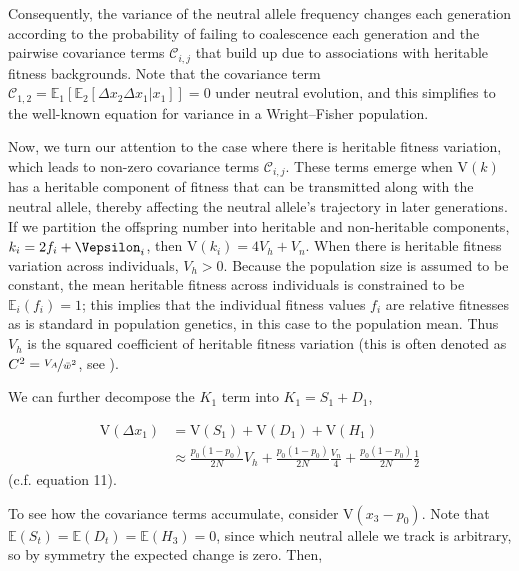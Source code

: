 \documentclass[11pt]{article}
\newcommand{\E}{\mathbb{E}}
\newcommand{\V}{\text{V}}
\newcommand{\V}{\text{V}}
\begin{document}
Consequently, the variance of the neutral allele frequency changes each
generation according to the probability of failing to coalescence each
generation and the pairwise covariance terms $\mathcal{C}_{i,j}$ that build up
due to associations with heritable fitness backgrounds. Note that the
covariance term $\mathcal{C}_{1,2} = \E_1\left[\E_2[\Delta x_2 \Delta x_1 |
x_1]\right] = 0$ under neutral evolution, and this simplifies to the well-known
equation for variance in a Wright--Fisher population.

Now, we turn our attention to the case where there is heritable fitness
variation, which leads to non-zero covariance terms $\mathcal{C}_{i,j}$. These
terms emerge when $\V(k)$ has a heritable component of fitness that can be
transmitted along with the neutral allele, thereby affecting the neutral
allele's trajectory in later generations. If we partition the offspring number
into heritable and non-heritable components, $k_i = 2f_i + \Vepsilon_i$, then
$\V(k_i) = 4 V_h + V_n$. When there is heritable fitness variation across
individuals, $V_h > 0$. Because the population size is assumed to be constant,
the mean heritable fitness across individuals is constrained to be $\E_i(f_i) =
1$; this implies that the individual fitness values $f_i$ are relative
fitnesses as is standard in population genetics, in this case to the population
mean. Thus $V_h$ is the squared coefficient of heritable fitness variation
(this is often denoted as $C^2 = \nicefrac{V_A}{\bar{w}^2}$, see
\cite{Crow1958-pc,Charlesworth1987-ab,Houle1992-ur}).

We can further decompose the $K_1$ term into $K_1 = S_1 + D_1$,

\begin{align}
  \V(\Delta x_1) &= \V(S_1) + \V(D_1) + \V(H_1) \nonumber \\
                   &\approx \frac{p_0(1-p_0)}{2N} V_h + \frac{p_0(1-p_0)}{2N} \frac{V_n}{4} + \frac{p_0(1-p_0)}{2N} \frac{1}{2} \label{supp-eq:varterms} 
\end{align}
%
(c.f. \cite{Santiago1995-hx} equation 11).

To see how the covariance terms accumulate, consider $\V(x_3 - p_0)$. Note
that $\E(S_t) = \E(D_t) = \E(H_3) = 0$, since which neutral allele we track is
arbitrary, so by symmetry the expected change is zero. Then,
\end{document}
